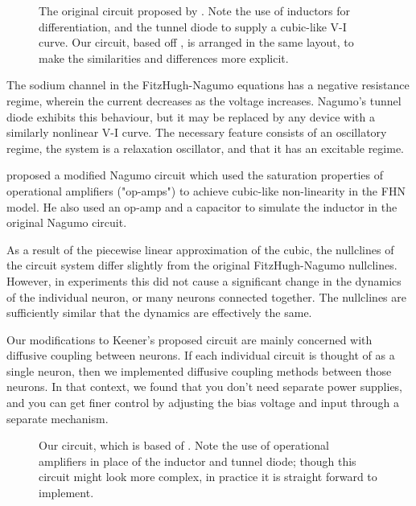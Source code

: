 \documentclass[
    11pt,
]{article}
\begin{document}
\begin{figure}[h!]
    \centering
    \caption{The original circuit proposed by \citet{nagumo1962}.  Note the use of inductors for differentiation, and the tunnel diode to supply a cubic-like V-I curve.  Our circuit, based off \citet{keener1983}, is arranged in the same layout, to make the similarities and differences more explicit.}
    \label{fig: nagumo_ckt}
\end{figure}


The sodium channel in the FitzHugh-Nagumo equations has a negative resistance regime, wherein the current decreases as the voltage increases.  Nagumo's tunnel diode exhibits this behaviour, but it may be replaced by any device with a similarly nonlinear V-I curve.  The necessary feature consists of an oscillatory regime, the system is a relaxation oscillator, and that it has an excitable regime.

\citet{keener1983} proposed a modified Nagumo circuit which used the saturation properties of operational amplifiers ("op-amps") to achieve cubic-like non-linearity in the FHN model. He also used an op-amp and a capacitor to simulate the inductor in the original Nagumo circuit.

As a result of the piecewise linear approximation of the cubic, the nullclines of the circuit system differ slightly from the original FitzHugh-Nagumo nullclines.  However, in experiments this did not cause a significant change in the dynamics of the individual neuron, or many neurons connected together.  The nullclines are sufficiently similar that the dynamics are effectively the same.

Our modifications to Keener's proposed circuit are mainly concerned with diffusive coupling between neurons. If each individual circuit is thought of as a single neuron, then we implemented diffusive coupling methods between those neurons.  In that context, we found that you don't need separate power supplies, and you can get finer control by adjusting the bias voltage and input through a separate mechanism.

\begin{figure}[h!]
    \centering
    \caption{Our circuit, which is based of \citet{keener1983}.  Note the use of operational amplifiers in place of the inductor and tunnel diode; though this circuit might look more complex, in practice it is straight forward to implement.}
    \label{fig: neuron_unit}
\end{figure}
\end{document}
